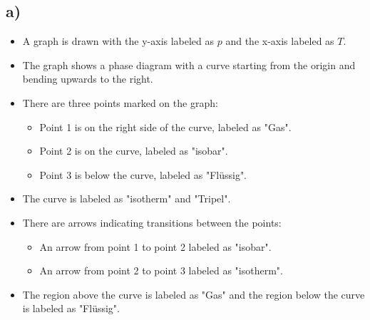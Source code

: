 

\subsection*{a)}

\begin{itemize}
    \item A graph is drawn with the y-axis labeled as \( p \) and the x-axis labeled as \( T \).
    \item The graph shows a phase diagram with a curve starting from the origin and bending upwards to the right.
    \item There are three points marked on the graph:
        \begin{itemize}
            \item Point 1 is on the right side of the curve, labeled as "Gas".
            \item Point 2 is on the curve, labeled as "isobar".
            \item Point 3 is below the curve, labeled as "Flüssig".
        \end{itemize}
    \item The curve is labeled as "isotherm" and "Tripel".
    \item There are arrows indicating transitions between the points:
        \begin{itemize}
            \item An arrow from point 1 to point 2 labeled as "isobar".
            \item An arrow from point 2 to point 3 labeled as "isotherm".
        \end{itemize}
    \item The region above the curve is labeled as "Gas" and the region below the curve is labeled as "Flüssig".
\end{itemize}